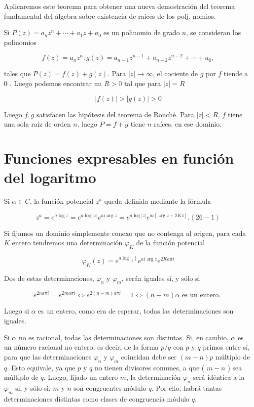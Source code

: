 \documentclass[10pt]{article}
\theoremstyle{plain}
\theoremstyle{definition}
\theoremstyle{remark}
\begin{document}
Aplicaremos este teorema para obtener una nueva demostración del teorema fundamental del álgebra sobre existencia de raíces de los polj. nomios.

Si $P(z)=a_{n} z^{n}+\cdots+a_{1} z+a_{0}$ es un polinomio de grado $n$, se consideran los polinomios

$$
f(z)=a_{n} z^{n} ; g(z)=a_{n-1} z^{n-1}+a_{n-2} z^{n-2}+\cdots+a_{0},
$$

tales que $P(z)=f(z)+g(z)$. Para $|z| \rightarrow \infty$, el cociente de $g$ por $f$ tiende a 0 . Luego podemos encontrar un $R>0$ tal que para $|z|=R$

$$
|f(z)|>|g(z)|>0
$$

Luego $f, g$ satisfacen las hipótesis del teorema de Rouché. Para $|z|<R$, $f$ tiene una sola raíz de orden $n$, luego $P=f+g$ tiene $n$ raíces. en ese dominio.

\section{Funciones expresables en función del logaritmo}
Si $\alpha \in C$, la función potencial $z^{a}$ queda definida mediante la fórmula

$$
z^{a}=e^{a \log z}=e^{a \log |z|} e^{a i \arg z}=e^{a \log |z|} e^{a i[\arg z+2 K \pi]} .(26-1)
$$

Si fijamos un dominio simplemente conexo que no contenga al origen, para cada $K$ entero tendremos una determinación $\varphi_{K}$ de la función potencial

$$
\varphi_{K}(z)=e^{\left.a \log \right|_{z} \mid} e^{a i \arg z} e^{2 K a \pi i}
$$

Dos de estas determinaciones, $\varphi_{n}$ y $\varphi_{m}$, serán iguales si, y sólo si

$$
e^{2 n a \pi i}=e^{2 m a \pi i} \Leftrightarrow e^{2(n-m) a \pi i}=1 \Longleftrightarrow(n-m) \alpha \text { es un entero. }
$$

Luego si $\alpha$ es un entero, como era de esperar, todas las determinaciones son iguales.

Si $\alpha$ no es racional, todas las determinaciones son distintas. Si, en cambio, $\alpha$ es un número racional no entero, es decir, de la forma $p / q$ con $p$ y $q$ primos entre sí, para que las determinaciones $\varphi_{n}$ y $\varphi_{m}$ coincidan debe ser $(m-n) p$ múltiplo de $q$. Esto equivale, ya que $p$ y $q$ no tienen divisores comunes, a que ( $m-n$ ) sea múltiplo de $q$. Luego, fijado un entero $m$, la determinación $\varphi_{n}$ será idéntica a la $\varphi_{m}$ si, y sólo si, $m$ y $n$ son congruentes módulo $q$. Por ello, habrá tantas determinaciones distintas como clases de congruencia módulo $q$.
\end{document}
